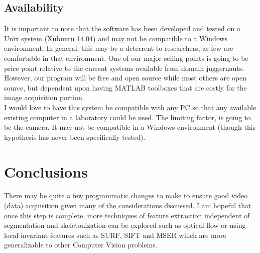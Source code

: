 \documentclass[main.tex]{subfiles}
\begin{document}
\subsection{Availability}
It is important to note that the software has been developed and tested on a Unix system (Xubuntu 14.04) and may not be compatible to a Windows environment. In general, this may be a deterrent to researchers, as few are comfortable in that environment. One of our major selling points is going to be price point relative to the current systems available from domain juggernauts. However, our program will be free and open source while most others are open source, but dependent upon having MATLAB toolboxes that are costly for the image acquisition portion.\\

I would love to have this system be compatible with any PC so that any available existing computer in a laboratory could be used. The limiting factor, is going to be the camera. It may not be compatible in a Windows environment (though this hypothesis has never been specifically tested). \\

\section{Conclusions}
There may be quite a few programmatic changes to make to ensure good video (data) acquisition given many of the considerations discussed. I am hopeful that once this step is complete, more techniques of feature extraction independent of segmentation and skeletonization can be explored such as optical flow or using local invariant features such as SURF, SIFT and MSER which are more generalizable to other Computer Vision problems. 
\end{document}
